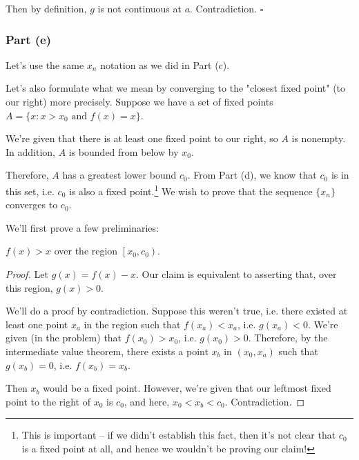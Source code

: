 Then by definition, $g$ is not continuous at $a$. Contradiction. $\square$



\subsubsection{Part (e)}

Let's use the same $x_n$ notation as we did in Part (c). 



Let's also formulate what we mean by converging to the "closest fixed point" (to our right) more precisely. Suppose we have a set of fixed points $A = \{x : x > x_0 \text{ and } f(x) = x\}$. 

We're given that there is at least one fixed point to our right, so $A$ is nonempty. In addition, $A$ is bounded from below by $x_0$. 

Therefore, $A$ has a greatest lower bound $c_0$. From Part (d), we know that $c_0$ is in this set, i.e. $c_0$ is also a fixed point.\footnote{This is important -- if we didn't establish this fact, then it's not clear that $c_0$ is a fixed point at all, and hence we wouldn't be proving our claim!} We wish to prove that the sequence $\{x_n\}$ converges to $c_0$.

We'll first prove a few preliminaries:

\begin{lemma}
\label{l:fp-iter-region}
$f(x) > x$ over the region $\left[x_0, c_0\right)$. 
\end{lemma}
\begin{proof}
Let $g(x) = f(x) - x$. Our claim is equivalent to asserting that, over this region, $g(x) > 0$.

We'll do a proof by contradiction. Suppose this weren't true, i.e. there existed at least one point $x_a$ in the region such that $f(x_a) < x_a$, i.e. $g(x_a) < 0$. We're given (in the problem) that $f(x_0) > x_0$, i.e. $g(x_0) > 0$. Therefore, by the intermediate value theorem, there exists a point $x_b$ in $(x_0, x_a)$ such that $g(x_b) = 0$, i.e. $f(x_b) = x_b$. 

Then $x_b$ would be a fixed point. However, we're given that our leftmost fixed point to the right of $x_0$ is $c_0$, and here, $x_0 < x_b < c_0$. Contradiction.
\end{proof}

